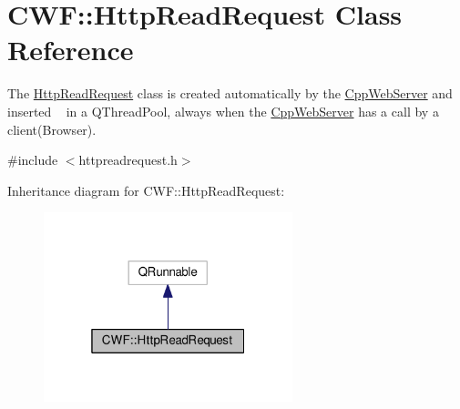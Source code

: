 \hypertarget{class_c_w_f_1_1_http_read_request}{\section{C\+W\+F\+:\+:Http\+Read\+Request Class Reference}
\label{class_c_w_f_1_1_http_read_request}
}


The \hyperlink{class_c_w_f_1_1_http_read_request}{Http\+Read\+Request} class is created automatically by the \hyperlink{class_c_w_f_1_1_cpp_web_server}{Cpp\+Web\+Server} and inserted ~\newline
 in a Q\+Thread\+Pool, always when the \hyperlink{class_c_w_f_1_1_cpp_web_server}{Cpp\+Web\+Server} has a call by a client(\+Browser).  




{\ttfamily \#include $<$httpreadrequest.\+h$>$}



Inheritance diagram for C\+W\+F\+:\+:Http\+Read\+Request\+:
\nopagebreak
\begin{figure}[H]
\begin{center}
\leavevmode
\includegraphics[width=205pt]{class_c_w_f_1_1_http_read_request__inherit__graph}
\end{center}
\end{figure}
